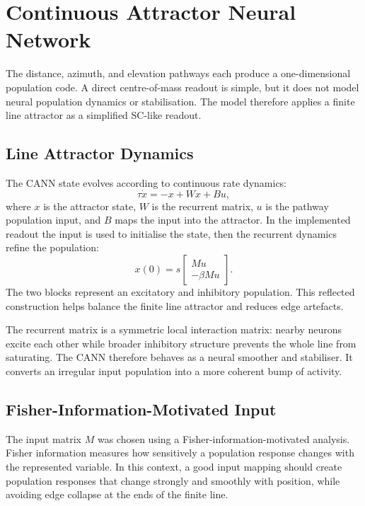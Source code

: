\section{Continuous Attractor Neural Network}

The distance, azimuth, and elevation pathways each produce a one-dimensional population code. A direct centre-of-mass readout is simple, but it does not model neural population dynamics or stabilisation. The model therefore applies a finite line attractor as a simplified SC-like readout.

\subsection{Line Attractor Dynamics}

The CANN state evolves according to continuous rate dynamics:
\begin{equation}
    \tau \dot{x} = -x + Wx + Bu,
\end{equation}
where $x$ is the attractor state, $W$ is the recurrent matrix, $u$ is the pathway population input, and $B$ maps the input into the attractor. In the implemented readout the input is used to initialise the state, then the recurrent dynamics refine the population:
\begin{equation}
    x(0)=s
    \begin{bmatrix}
        Mu\\
        -\beta Mu
    \end{bmatrix}.
\end{equation}
The two blocks represent an excitatory and inhibitory population. This reflected construction helps balance the finite line attractor and reduces edge artefacts.

The recurrent matrix is a symmetric local interaction matrix: nearby neurons excite each other while broader inhibitory structure prevents the whole line from saturating. The CANN therefore behaves as a neural smoother and stabiliser. It converts an irregular input population into a more coherent bump of activity.

\subsection{Fisher-Information-Motivated Input}

The input matrix $M$ was chosen using a Fisher-information-motivated analysis. Fisher information measures how sensitively a population response changes with the represented variable. In this context, a good input mapping should create population responses that change strongly and smoothly with position, while avoiding edge collapse at the ends of the finite line.

